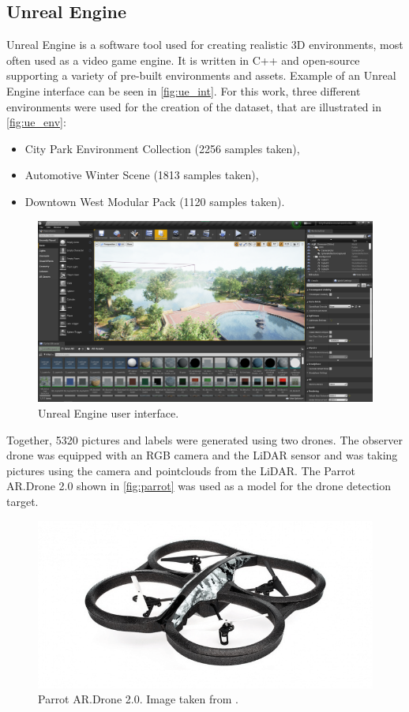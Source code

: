 \documentclass[twoside]{ctuthesis}
\theoremstyle{plain}
\theoremstyle{definition}
\theoremstyle{note}
\begin{document}
\subsection{Unreal Engine}
Unreal Engine is a software tool used for creating realistic 3D environments, most often used as a video game engine. It is written in C++ and open-source supporting a variety of pre-built environments and assets. Example of an Unreal Engine interface can be seen in \autoref{fig:ue_int}. For this work, three different environments were used for the creation of the dataset, that are illustrated in \ref{fig:ue_env}:
\begin{itemize}
	\item City Park Environment Collection (2256 samples taken),
	\item Automotive Winter Scene (1813 samples taken),
	\item Downtown West Modular Pack (1120 samples taken).
\end{itemize}
\begin{figure}
	\centering
	\includegraphics[width=\textwidth]{unreal_ui.png}
	\caption{Unreal Engine user interface.}
	\label{fig:ue_int}
\end{figure}
Together, 5320 pictures and labels were generated using two drones. The observer drone was equipped with an RGB camera and the LiDAR sensor and was taking pictures using the camera and pointclouds from the LiDAR. The Parrot AR.Drone 2.0 shown in \autoref{fig:parrot} was used as a model for the drone detection target.
\begin{figure}
	\centering
	\includegraphics[width=\textwidth]{parrot.png}
	\caption{Parrot AR.Drone 2.0. Image taken from \cite{parrot}.}
	\label{fig:parrot}
\end{figure}
\end{document}
